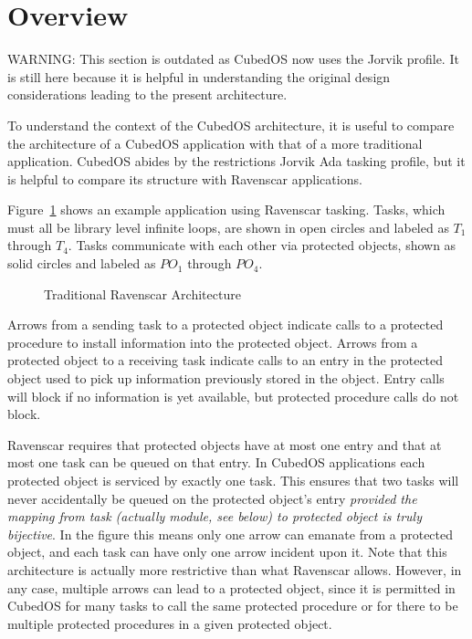 
\section{Overview}
\label{sec:overview}

WARNING: This section is outdated as CubedOS now uses the Jorvik profile. It is still here
because it is helpful in understanding the original design considerations leading to the present
architecture.

To understand the context of the CubedOS architecture, it is useful to compare the architecture
of a CubedOS application with that of a more traditional application. CubedOS abides by the
restrictions Jorvik Ada tasking profile, but it is helpful to compare its structure with
Ravenscar applications.

Figure~\ref{fig:traditional-architecture} shows an example application using Ravenscar tasking.
Tasks, which must all be library level infinite loops, are shown in open circles and labeled as
$T_1$ through $T_4$. Tasks communicate with each other via protected objects, shown as solid
circles and labeled as $PO_1$ through $PO_4$.

\begin{figure}[tbhp]
  \center
  \caption{Traditional Ravenscar Architecture}
  \label{fig:traditional-architecture}
\end{figure}

Arrows from a sending task to a protected object indicate calls to a protected procedure to
install information into the protected object. Arrows from a protected object to a receiving
task indicate calls to an entry in the protected object used to pick up information previously
stored in the object. Entry calls will block if no information is yet available, but protected
procedure calls do not block.

Ravenscar requires that protected objects have at most one entry and that at most one task can
be queued on that entry. In CubedOS applications each protected object is serviced by exactly
one task. This ensures that two tasks will never accidentally be queued on the protected
object's entry \emph{provided the mapping from task (actually module, see below) to protected
  object is truly bijective}. In the figure this means only one arrow can emanate from a
protected object, and each task can have only one arrow incident upon it. Note that this
architecture is actually more restrictive than what Ravenscar allows. However, in any case,
multiple arrows can lead to a protected object, since it is permitted in CubedOS for many tasks
to call the same protected procedure or for there to be multiple protected procedures in a given
protected object.

